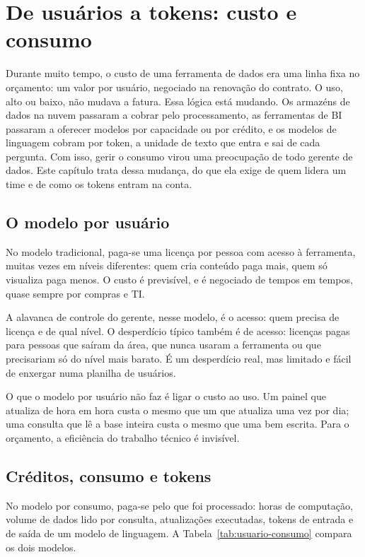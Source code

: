 \chapter{De usuários a tokens: custo e consumo}
\label{cap:custo-consumo}

Durante muito tempo, o custo de uma ferramenta de dados era uma linha fixa no orçamento: um
valor por usuário, negociado na renovação do contrato. O uso, alto ou baixo, não mudava a
fatura. Essa lógica está mudando. Os armazéns de dados na nuvem passaram a cobrar pelo
processamento, as ferramentas de BI passaram a oferecer modelos por capacidade ou por
crédito, e os modelos de linguagem cobram por token, a unidade de texto que entra e sai de
cada pergunta. Com isso, gerir o consumo virou uma preocupação de todo gerente de dados. Este
capítulo trata dessa mudança, do que ela exige de quem lidera um time e de como os tokens
entram na conta.

\section{O modelo por usuário}
\label{sec:modelo-usuario}

No modelo tradicional, paga-se uma licença por pessoa com acesso à ferramenta, muitas vezes
em níveis diferentes: quem cria conteúdo paga mais, quem só visualiza paga menos. O custo é
previsível, e é negociado de tempos em tempos, quase sempre por compras e TI.

A alavanca de controle do gerente, nesse modelo, é o acesso: quem precisa de licença e de
qual nível. O desperdício típico também é de acesso: licenças pagas para pessoas que saíram da
área, que nunca usaram a ferramenta ou que precisariam só do nível mais barato. É um
desperdício real, mas limitado e fácil de enxergar numa planilha de usuários.

O que o modelo por usuário não faz é ligar o custo ao uso. Um painel que atualiza de hora em
hora custa o mesmo que um que atualiza uma vez por dia; uma consulta que lê a base inteira custa
o mesmo que uma bem escrita. Para o orçamento, a eficiência do trabalho técnico é invisível.

\section{Créditos, consumo e tokens}
\label{sec:modelo-consumo}

No modelo por consumo, paga-se pelo que foi processado: horas de computação, volume de dados
lido por consulta, atualizações executadas, tokens de entrada e de saída de um modelo de
linguagem. A Tabela~\ref{tab:usuario-consumo} compara os dois modelos.

